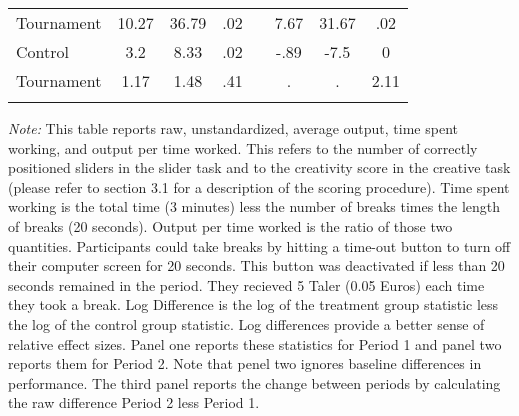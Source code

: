 \begin{landscape}
\begin{table}[h]
\begin{center}
{\begin{tabular}{lccccccc}
\hline
Tournament & 10.27 & 36.79 & .02 && 7.67 & 31.67 & .02 \\
Control & 3.2 & 8.33 & .02 && -.89 & -7.5 & 0 \\
Tournament & 1.17 & 1.48 & .41 && . & . & 2.11 \\
\hline\hline\noalign{\medskip}
\end{tabular}}
\begin{minipage}{1.2\textwidth}
\footnotesize {\it Note:} This table reports raw, unstandardized, average output, time spent working, and output per time worked. 
This refers to the number of correctly positioned sliders in the slider task and to the creativity score in the creative task (please refer to section 3.1 for a description of the scoring procedure). 
Time spent working is the total time (3 minutes) less the number of breaks times the length of breaks (20 seconds). 
Output per time worked is the ratio of those two quantities. 
Participants could take breaks by hitting a time-out button to turn off their computer screen for 20 seconds. This button was deactivated if less than 20 seconds remained in the period. They recieved 5 Taler (0.05 Euros) each time they took a break. 
Log Difference is the log of the treatment group statistic less the log of the control group statistic. Log differences provide a better sense of relative effect sizes. 
Panel one reports these statistics for Period 1 and panel two reports them for Period 2. Note that penel two ignores baseline differences in performance. 
The third panel reports the change between periods by calculating the raw difference Period 2 less Period 1. 
 
 
\end{minipage}
\end{center}
\end{table}
\end{landscape}
